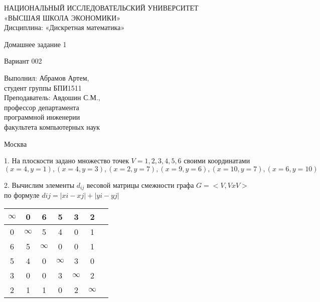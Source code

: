 \documentclass[a4paper,10pt]{report} %
\begin{document}
\begin{titlepage}
\newpage

\begin{center}
{\large НАЦИОНАЛЬНЫЙ ИССЛЕДОВАТЕЛЬСКИЙ УНИВЕРСИТЕТ \\
«ВЫСШАЯ ШКОЛА ЭКОНОМИКИ» 							\\
Дисциплина: «Дискретная математика»}

\vfill %

{\large Домашнее задание 1}

\bigskip

Вариант 002\\

\vfill

\begin{flushright}
Выполнил: Абрамов Артем,\\
студент группы БПИ1511\medskip \\
Преподаватель: Авдошин С.М., \\
профессор департамента \\
программной инженерии \\
факультета компьютерных наук
\end{flushright}

\vfill

Москва \number\year

\end{center}
\end{titlepage}


1. \quad На плоскости задано множество точек $V = {1, 2, 3, 4, 5, 6}$ своими координатами
$(x = 4,y = 1),(x = 4,y = 3),(x = 2,y = 7),(x = 9,y = 6),(x = 10,y = 7),(x = 6,y = 10)$ \\

\smallskip

2. \quad Вычислим элементы $d_{ij}$ весовой матрицы смежности графа 
$G = <V, VxV>$ по формуле $dij = |xi - xj|  +  |yi - yj|$

\begin{flushleft}\begin{tabular}[]{|c|c|c|c|c|c|c|}
\hline
$\infty$ &      0 &      6 &      5 &      3 &      2\\
\hline
	  0 & $\infty$ &      5 &      4 &      0 &      1\\
\hline
      6 &      5 & $\infty$ &      0 &      0 &      1\\
\hline
      5 &      4 &      0 & $\infty$ &      3 &      0\\
\hline
      3 &      0 &      0 &      3 & $\infty$ &      2\\
\hline
      2 &      1 &      1 &      0 &      2 & $\infty$\\
\hline
\end{tabular}
\end{flushleft}
\end{document}
